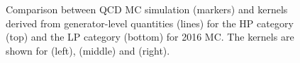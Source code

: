 \begin{figure}[h!]
\caption{Comparison between QCD MC simulation (markers) and kernels derived from generator-level quantities (lines) for the HP category (top) and the LP category (bottom) for 2016 MC. The kernels are shown for \MJO (left), \MJT (middle) and \MVV (right).}
\label{fig:3DkernelsHPHPpythia}
\end{figure}

